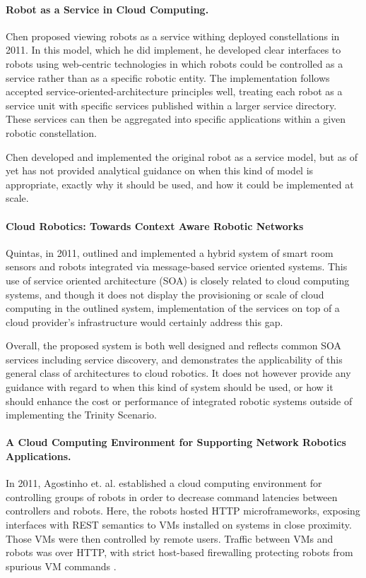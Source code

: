 \documentclass[10pt,letterpaper]{article}
\begin{document}
\paragraph{Robot as a Service in Cloud Computing.}
Chen proposed viewing robots as a service withing deployed constellations in 2011.  In this model, which he did implement, he developed clear interfaces to robots using web-centric technologies in which robots could be controlled as a service rather than as a specific robotic entity. The implementation follows accepted service-oriented-architecture principles well, treating each robot as a service unit with specific services published within a larger service directory.  These services can then be aggregated into specific applications within a given robotic constellation\cite{YiZhGa:10}.

Chen developed and implemented the original robot as a service model, but as of yet has not provided analytical guidance on when this kind of model is appropriate, exactly why it should be used, and how it could be implemented at scale.

\paragraph{Cloud Robotics: Towards Context Aware Robotic Networks}
Quintas, in 2011, outlined and implemented a hybrid system of smart room sensors and robots integrated via message-based service oriented systems.  This use of service oriented architecture (SOA) is closely related to cloud computing systems, and though it does not display the provisioning or scale of cloud computing in the outlined system, implementation of the services on top of a cloud provider's infrastructure would certainly address this gap\cite{QuMeDi:11}.

Overall, the proposed system is both well designed and reflects common SOA services including service discovery, and demonstrates the applicability of this general class of architectures to cloud robotics.  It does not however provide any guidance with regard to when this kind of system should be used, or how it should enhance the cost or performance of integrated robotic systems outside of implementing the Trinity Scenario.

\paragraph{A Cloud Computing Environment for Supporting Network Robotics Applications.}
In 2011, Agostinho et. al. established a cloud computing environment for controlling groups of robots in order to decrease command latencies between controllers and robots.  Here, the robots hosted HTTP microframeworks, exposing interfaces with REST semantics to VMs installed on systems in close proximity.  Those VMs were then controlled by remote users.  Traffic between VMs and robots was over HTTP, with strict host-based firewalling protecting robots from spurious VM commands \cite{AgOlFePa:11}.
\end{document}
